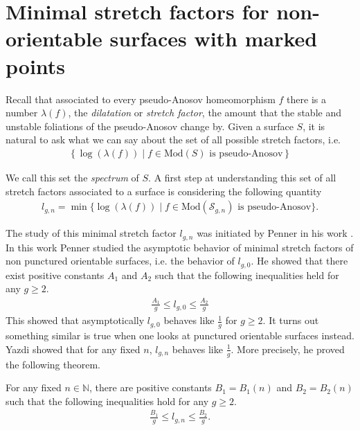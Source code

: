 \section{Minimal stretch factors for non-orientable surfaces with marked points}
\label{sec:application}

Recall that associated to every pseudo-Anosov homeomorphism $f$ there is a number $\lambda(f)$, the
\textit{dilatation} or \textit{stretch factor}, the amount that the stable and unstable foliations of the
pseudo-Anosov change by. Given a surface $S$, it is natural to ask what we can say about the set of all
possible stretch factors, i.e.
\begin{align*}
    \left\{\log(\lambda(f)) \mid f \in \text{Mod}(S) \text{ is pseudo-Anosov}\right\}
\end{align*}

We call this set the \textit{spectrum} of $S$. A first step at understanding this set of all stretch factors
associated to a surface is considering the following quantity
\begin{align*}
    l_{g,n} =\min\{\log(\lambda(f)) \mid f \in \text{Mod}(\mathcal{S}_{g,n}) \text{ is pseudo-Anosov}\}.
\end{align*}

The study of this minimal stretch factor $l_{g,n}$ was initiated by Penner in his work
\cite{penner1991bounds}. In this work Penner studied the asymptotic behavior of minimal stretch factors of non
punctured orientable surfaces, i.e. the behavior of $l_{g,0}$. He showed that there exist positive constants
$A_1$ and $A_2$ such that the following inequalities held for any $g \geq 2$.
\begin{align*}
    \frac{A_1}{g} \leq l_{g,0} \leq \frac{A_2}{g}
\end{align*}
This showed that asymptotically $l_{g,0}$ behaves like $\frac{1}{g}$ for $g \geq 2$.
It turns out something similar is true when one looks at punctured orientable surfaces instead. Yazdi showed
that for any fixed $n$, $l_{g,n}$ behaves like $\frac{1}{g}$. More precisely, he proved the following theorem.
\begin{thm}
\label{thm:yazdi1}
For any fixed $n \in \mathbb{N}$, there are positive constants $B_1 = B_1(n)$ and $B_2 = B_2(n)$ such that the following inequalities hold for
any $g \geq 2$.
\begin{align*}
    \frac{B_1}{g} \leq l_{g,n} \leq \frac{B_2}{g}.
\end{align*}
\end{thm}

